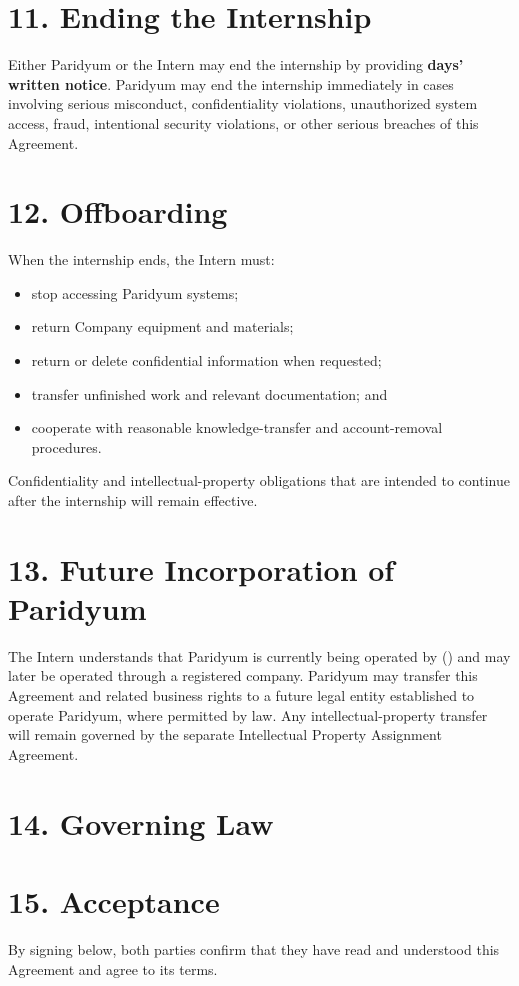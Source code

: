 \documentclass{paridyum}
\begin{document}
\section*{11. Ending the Internship}
Either Paridyum or the Intern may end the internship by providing
\textbf{\dkOrgNoticePeriodDays{} days' written notice}. Paridyum may end the internship
immediately in cases involving serious misconduct, confidentiality violations,
unauthorized system access, fraud, intentional security violations, or other serious
breaches of this Agreement.

\section*{12. Offboarding}
When the internship ends, the Intern must:
\begin{itemize}[leftmargin=*, noitemsep]
    \item stop accessing Paridyum systems;
    \item return Company equipment and materials;
    \item return or delete confidential information when requested;
    \item transfer unfinished work and relevant documentation; and
    \item cooperate with reasonable knowledge-transfer and account-removal procedures.
\end{itemize}
Confidentiality and intellectual-property obligations that are intended to continue
after the internship will remain effective.

\section*{13. Future Incorporation of Paridyum}
The Intern understands that Paridyum is currently being operated by
\textbf{\dkSigDirectorName} (\dkSigDirectorDesignation) and may later be operated
through a registered company. Paridyum may transfer this Agreement and related
business rights to a future legal entity established to operate Paridyum, where
permitted by law. Any intellectual-property transfer will remain governed by the
separate Intellectual Property Assignment Agreement.

\section*{14. Governing Law}


\section*{15. Acceptance}
By signing below, both parties confirm that they have read and understood this
Agreement and agree to its terms.

\vspace{1.5em}
\paridyumofficers{\dkSigCeoName}{\dkSigCeoDesignation}{\dkSigCtoName}{\dkSigCtoDesignation}

\vspace{1.5em}
\end{document}
